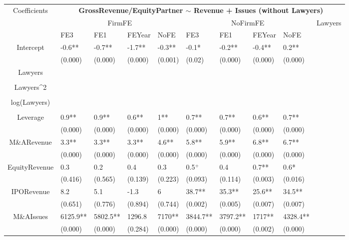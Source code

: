 \documentclass{article}
\begin{document}
\begin{table}[H]
\centering
\begin{tabular}{|clllllllll|}
\hline
\multirow{3}{*}{Coefficients} & \multicolumn{9}{c|}{\textbf{GrossRevenue/EquityPartner $\sim$ Revenue + Issues (without Lawyers)}} \\
\cline{2-10}
& \multicolumn{4}{c}{FirmFE} & \multicolumn{4}{c}{NoFirmFE} & \multirow{2}{*}{Lawyers} \\
\cline{2-9}
& FE3 & FE1 & FEYear & NoFE & FE3 & FE1 & FEYear & NoFE &  \\
\hline
 
Intercept & -0.6** & -0.7** & -1.7** & -0.3** & -0.1* & -0.2** & -0.4** & 0.2** & \\ 
   & (0.000) & (0.000) & (0.000) & (0.001) & (0.02) & (0.000) & (0.000) & (0.000) & \\ 
  Lawyers &  &  &  &  &  &  &  &  & \\ 
   &  &  &  &  &  &  &  &  & \\ 
  Lawyers^2 &  &  &  &  &  &  &  &  & \\ 
   &  &  &  &  &  &  &  &  & \\ 
  log(Lawyers) &  &  &  &  &  &  &  &  & \\ 
   &  &  &  &  &  &  &  &  & \\ 
  Leverage & 0.9** & 0.9** & 0.6** & 1** & 0.7** & 0.7** & 0.6** & 0.7** & \\ 
   & (0.000) & (0.000) & (0.000) & (0.000) & (0.000) & (0.000) & (0.000) & (0.000) & \\ 
  M\&ARevenue & 3.3** & 3.3** & 3.3** & 4.6** & 5.8** & 5.9** & 6.8** & 6.7** & \\ 
   & (0.000) & (0.000) & (0.000) & (0.000) & (0.000) & (0.000) & (0.000) & (0.000) & \\ 
  EquityRevenue & 0.3 & 0.2 & 0.4 & 0.3 & 0.5$^{+}$ & 0.4 & 0.7** & 0.6* & \\ 
   & (0.416) & (0.565) & (0.139) & (0.223) & (0.093) & (0.114) & (0.003) & (0.016) & \\ 
  IPORevenue & 8.2 & 5.1 & -1.3 & 6 & 38.7** & 35.3** & 25.6** & 34.5** & \\ 
   & (0.651) & (0.776) & (0.894) & (0.744) & (0.002) & (0.005) & (0.007) & (0.007) & \\ 
  M\&AIssues & 6125.9** & 5802.5** & 1296.8 & 7170** & 3844.7** & 3797.2** & 1717** & 4328.4** & \\ 
   & (0.000) & (0.000) & (0.284) & (0.000) & (0.000) & (0.000) & (0.002) & (0.000) & \\ 

\end{tabular}
\end{table}
\end{document}
